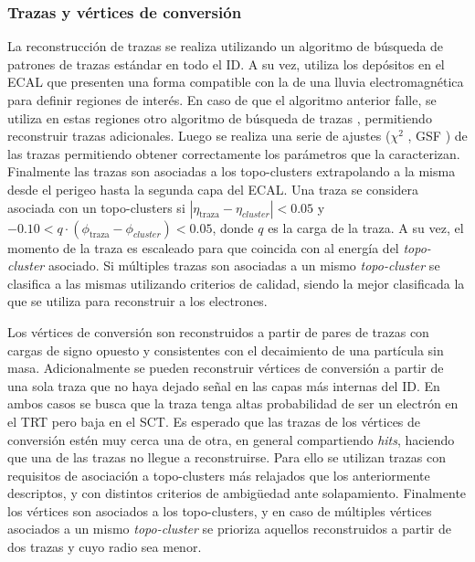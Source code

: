 
\subsubsection{Trazas y vértices de conversión}

La reconstrucción de trazas se realiza utilizando un algoritmo de búsqueda de patrones de trazas estándar
\cite{newt, PERF-2017-02, PERF-2017-01} en todo el ID. A su vez, utiliza los depósitos en el ECAL que presenten una forma compatible con la de una lluvia electromagnética para definir regiones de interés. En caso de que el algoritmo anterior falle, se utiliza en estas regiones otro algoritmo de búsqueda de trazas \cite{Kalman}, permitiendo reconstruir trazas adicionales. Luego se realiza una serie de ajustes ($\chi^2$ \cite{chi2}, GSF \cite{gsf}) de las trazas permitiendo obtener correctamente los parámetros que la caracterizan. Finalmente las trazas son asociadas a los topo-clusters extrapolando a la misma desde el perigeo hasta la segunda capa del ECAL. Una traza se considera asociada con un topo-clusters si $|\eta_{\text{traza}}-\eta_{\textit{cluster}}|<0.05$ y $-0.10<q\cdot(\phi_{\text{traza}}-\phi_{\textit{cluster}})<0.05$, donde $q$ es la carga de la traza. A su vez, el momento de la traza es escaleado para que coincida con al energía del \textit{topo-cluster} asociado. Si múltiples trazas son asociadas a un mismo \textit{topo-cluster} se clasifica a las mismas utilizando criterios de calidad, siendo la mejor clasificada la que se utiliza para reconstruir a los electrones. 

Los vértices de conversión son reconstruidos a partir de pares de trazas con cargas de signo opuesto y consistentes con el decaimiento de una partícula sin masa. Adicionalmente se pueden reconstruir vértices de conversión a partir de una sola traza que no haya dejado señal en las capas más internas del ID. En ambos casos se busca que la traza tenga altas probabilidad de ser un electrón en el TRT \cite{trt} pero baja en el SCT. Es esperado que las trazas de los vértices de conversión estén muy cerca una de otra, en general compartiendo \textit{hits}, haciendo que una de las trazas no llegue a reconstruirse. Para ello se utilizan trazas con requisitos de asociación a topo-clusters más relajados que los anteriormente descriptos, y con distintos criterios de ambigüedad ante solapamiento. Finalmente los vértices son asociados a los topo-clusters, y en caso de múltiples vértices asociados a un mismo \textit{topo-cluster} se prioriza aquellos reconstruidos a partir de dos trazas y cuyo radio sea menor.

